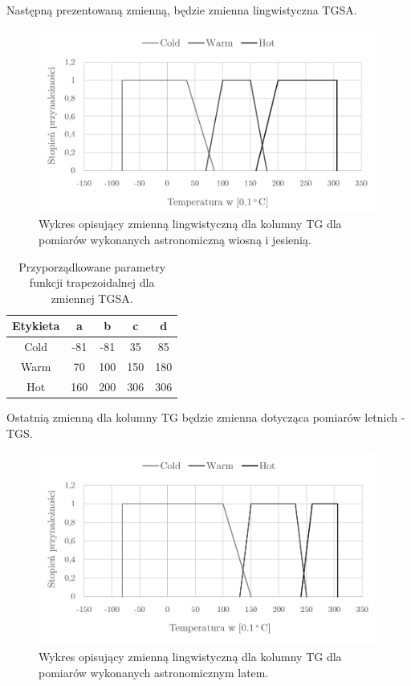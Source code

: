 \documentclass{classrep}
\begin{document}
Następną prezentowaną zmienną, będzie zmienna lingwistyczna TGSA.
\begin{figure}[H]
	\centering
	\includegraphics[width=0.99\textwidth]{Pictures/TermsCharts/TG_WJ.png}
	\caption{Wykres opisujący zmienną lingwistyczną dla kolumny TG dla pomiarów wykonanych astronomiczną wiosną i jesienią.}
\end{figure}

\begin{table}[H]
	\centering
	\begin{tabular}{c c c c c} 
		\hline
		\textbf{Etykieta} & \textbf{a} & \textbf{b} & \textbf{c} & \textbf{d}\\ [0.5ex] 
		\hline
		\hline 
Cold	 &-81 & -81 & 35 & 85 \\
Warm & 70 & 100 & 150 & 180 \\
Hot	 & 160 & 200 & 306 & 306 \\
		\hline
	\end{tabular}
	\caption{Przyporządkowane parametry funkcji trapezoidalnej dla zmiennej TGSA.}
\end{table}


Ostatnią zmienną dla kolumny TG będzie zmienna dotycząca pomiarów letnich - TGS.
\begin{figure}[H]
	\centering
	\includegraphics[width=0.99\textwidth]{Pictures/TermsCharts/TG_L.png}
	\caption{Wykres opisujący zmienną lingwistyczną dla kolumny TG dla pomiarów wykonanych astronomicznym latem.}
\end{figure}
\end{document}
